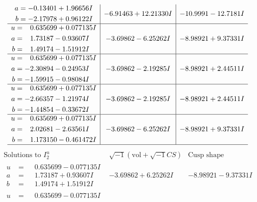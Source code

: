 \documentclass[1p]{elsarticle_modified}
\theoremstyle{definition}
\newcommand{\I}{\sqrt{-1}}
\begin{document}
$$\begin{array}{c|c|c}
\begin{aligned}
a &= -0.13401 + 1.96656 I \\
b &= -2.17978 + 0.96122 I\end{aligned}
 & -6.91463 + 12.21330 I & -10.9991 - 12.7181 I \\ \hline\begin{aligned}
u &= \phantom{-}0.635699 + 0.077135 I \\
a &= \phantom{-}1.73187 - 0.93607 I \\
b &= \phantom{-}1.49174 - 1.51912 I\end{aligned}
 & -3.69862 - 6.25262 I & -8.98921 + 9.37331 I \\ \hline\begin{aligned}
u &= \phantom{-}0.635699 + 0.077135 I \\
a &= -2.30894 - 0.24953 I \\
b &= -1.59915 - 0.98084 I\end{aligned}
 & -3.69862 - 2.19285 I & -8.98921 + 2.44511 I \\ \hline\begin{aligned}
u &= \phantom{-}0.635699 + 0.077135 I \\
a &= -2.66357 - 1.21974 I \\
b &= -1.44854 - 0.33672 I\end{aligned}
 & -3.69862 - 2.19285 I & -8.98921 + 2.44511 I \\ \hline\begin{aligned}
u &= \phantom{-}0.635699 + 0.077135 I \\
a &= \phantom{-}2.02681 - 2.63561 I \\
b &= \phantom{-}1.173150 - 0.461472 I\end{aligned}
 & -3.69862 - 6.25262 I & -8.98921 + 9.37331 I\\
 \hline 
 \end{array}$$\newpage$$\begin{array}{c|c|c}  
\text{Solutions to }I^u_{2}& \I (\text{vol} + \sqrt{-1}CS) & \text{Cusp shape}\\
 \hline 
\begin{aligned}
u &= \phantom{-}0.635699 - 0.077135 I \\
a &= \phantom{-}1.73187 + 0.93607 I \\
b &= \phantom{-}1.49174 + 1.51912 I\end{aligned}
 & -3.69862 + 6.25262 I & -8.98921 - 9.37331 I \\ \hline\begin{aligned}
u &= \phantom{-}0.635699 - 0.077135 I \\

\end{aligned}
\end{array}$$
\end{document}

